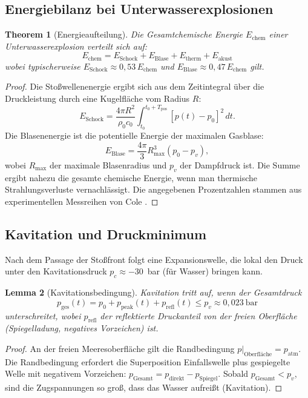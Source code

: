 ﻿\documentclass[12pt,a4paper]{article}
\newtheorem{theorem}{Theorem}[section]
\newtheorem{lemma}[theorem]{Lemma}
\theoremstyle{definition}
\theoremstyle{remark}
\begin{document}
\subsection{Energiebilanz bei Unterwasserexplosionen}

\begin{theorem}[Energieaufteilung]
\label{thm:energie_aufteilung}
Die Gesamtchemische Energie $E_{\text{chem}}$ einer Unterwasserexplosion verteilt sich auf:
\begin{equation}
E_{\text{chem}} = E_{\text{Schock}} + E_{\text{Blase}} + E_{\text{therm}} + E_{\text{akust}}
\end{equation}
wobei typischerweise $E_{\text{Schock}} \approx 0{,}53\,E_{\text{chem}}$ und $E_{\text{Blase}} \approx 0{,}47\,E_{\text{chem}}$ gilt.
\end{theorem}
\begin{proof}
Die Stoßwellenenergie ergibt sich aus dem Zeitintegral über die Druckleistung durch eine Kugelfläche vom Radius $R$:
\begin{equation}
E_{\text{Schock}} = \frac{4\pi R^2}{\rho_0 c_0}\int_{t_0}^{t_0+T_{\text{pos}}} [p(t) - p_0]^2\,dt.
\end{equation}
Die Blasenenergie ist die potentielle Energie der maximalen Gasblase:
\begin{equation}
E_{\text{Blase}} = \frac{4\pi}{3} R_{\max}^3 (p_0 - p_v),
\end{equation}
wobei $R_{\max}$ der maximale Blasenradius und $p_v$ der Dampfdruck ist. Die Summe ergibt nahezu die gesamte chemische Energie, wenn man thermische Strahlungsverluste vernachlässigt. Die angegebenen Prozentzahlen stammen aus experimentellen Messreihen von Cole \cite{cole1948}. 
\end{proof}

\subsection{Kavitation und Druckminimum}

Nach dem Passage der Stoßfront folgt eine Expansionswelle, die lokal den Druck unter den Kavitationsdruck $p_c \approx -30$~bar (für Wasser) bringen kann.

\begin{lemma}[Kavitationsbedingung]
\label{lem:kavitation}
Kavitation tritt auf, wenn der Gesamtdruck
\begin{equation}
p_{\text{ges}}(t) = p_0 + p_{\text{peak}}(t) + p_{\text{refl}}(t) \leq p_v \approx 0{,}023~\text{bar}
\end{equation}
unterschreitet, wobei $p_{\text{refl}}$ der reflektierte Druckanteil von der freien Oberfläche (Spiegelladung, negatives Vorzeichen) ist.
\end{lemma}
\begin{proof}
An der freien Meeresoberfläche gilt die Randbedingung $p|_{\text{Oberfläche}} = p_{\text{atm}}$. Die Randbedingung erfordert die Superposition Einfallswelle plus gespiegelte Welle mit negativem Vorzeichen: $p_{\text{Gesamt}} = p_{\text{direkt}} - p_{\text{Spiegel}}$. Sobald $p_{\text{Gesamt}} < p_v$, sind die Zugspannungen so groß, dass das Wasser aufreißt (Kavitation). 
\end{proof}
\end{document}

